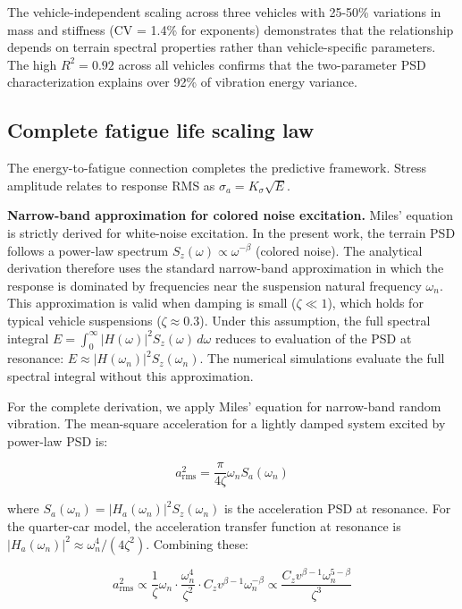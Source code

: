 \documentclass[11pt]{article}
\begin{document}
The vehicle-independent scaling across three vehicles with 25-50\% variations in mass and stiffness (CV = 1.4\% for exponents) demonstrates that the relationship depends on terrain spectral properties rather than vehicle-specific parameters. The high $R^2 = 0.92$ across all vehicles confirms that the two-parameter PSD characterization explains over 92\% of vibration energy variance.


\subsection*{Complete fatigue life scaling law}

The energy-to-fatigue connection completes the predictive framework. Stress amplitude relates to response RMS as $\sigma_a = K_\sigma \sqrt{E}$\cite{Dowling2013,Lutes2004}. 

\textbf{Narrow-band approximation for colored noise excitation.} Miles' equation\cite{Miles1954} is strictly derived for white-noise excitation. In the present work, the terrain PSD follows a power-law spectrum $S_z(\omega) \propto \omega^{-\beta}$ (colored noise). The analytical derivation therefore uses the standard narrow-band approximation in which the response is dominated by frequencies near the suspension natural frequency $\omega_n$. This approximation is valid when damping is small ($\zeta \ll 1$), which holds for typical vehicle suspensions ($\zeta \approx 0.3$). Under this assumption, the full spectral integral $E = \int_0^\infty |H(\omega)|^2 S_z(\omega)\, d\omega$ reduces to evaluation of the PSD at resonance: $E \approx |H(\omega_n)|^2 S_z(\omega_n)$. The numerical simulations evaluate the full spectral integral without this approximation.

For the complete derivation, we apply Miles' equation for narrow-band random vibration. The mean-square acceleration for a lightly damped system excited by power-law PSD is:

\begin{equation}
a_{\text{rms}}^2 = \frac{\pi}{4\zeta} \omega_n S_a(\omega_n)
\end{equation}

where $S_a(\omega_n) = |H_a(\omega_n)|^2 S_z(\omega_n)$ is the acceleration PSD at resonance. For the quarter-car model, the acceleration transfer function at resonance is $|H_a(\omega_n)|^2 \approx \omega_n^4/(4\zeta^2)$. Combining these:

\begin{equation}
a_{\text{rms}}^2 \propto \frac{1}{\zeta} \omega_n \cdot \frac{\omega_n^4}{\zeta^2} \cdot C_z v^{\beta-1} \omega_n^{-\beta} \propto \frac{C_z v^{\beta-1} \omega_n^{5-\beta}}{\zeta^3}
\end{equation}
\end{document}
